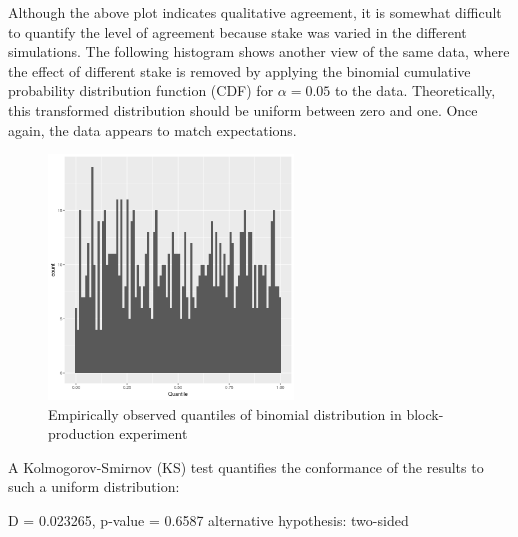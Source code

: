 \documentclass[10pt]{article}
\newenvironment{Shaded}{}{}
\newcommand{\AttributeTok}[1]{\textcolor[rgb]{0.49,0.56,0.16}{#1}}
\newcommand{\DecValTok}[1]{\textcolor[rgb]{0.25,0.63,0.44}{#1}}
\newcommand{\FunctionTok}[1]{\textcolor[rgb]{0.02,0.16,0.49}{#1}}
\newcommand{\NormalTok}[1]{#1}
\newcommand{\SpecialCharTok}[1]{\textcolor[rgb]{0.25,0.44,0.63}{#1}}
\newcommand{\StringTok}[1]{\textcolor[rgb]{0.25,0.44,0.63}{#1}}
\begin{document}
Although the above plot indicates qualitative agreement, it is somewhat
difficult to quantify the level of agreement because stake was varied in
the different simulations. The following histogram shows another view of
the same data, where the effect of different stake is removed by
applying the binomial cumulative probability distribution function (CDF)
for \(\alpha = 0.05\) to the data. Theoretically, this transformed
distribution should be uniform between zero and one. Once again, the
data appears to match expectations.

\begin{figure}
\centering
\includegraphics[width=0.58\textwidth]{../diagrams/sim-expts/blockproduction-quantiles.png}
\caption{Empirically observed quantiles of binomial distribution in
block-production experiment}
\end{figure}

A Kolmogorov-Smirnov (KS) test quantifies the conformance of the results
to such a uniform distribution:

\begin{Shaded}
\end{Shaded}

\begin{Shaded}
\begin{Highlighting}[]
\NormalTok{D = 0.023265, p{-}value = 0.6587}
\NormalTok{alternative hypothesis: two{-}sided}
\end{Highlighting}
\end{Shaded}
\end{document}
